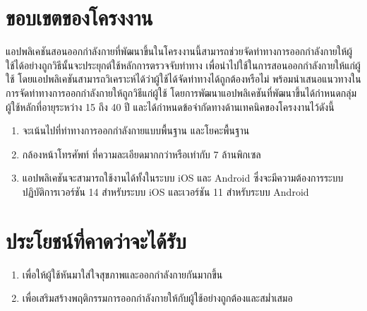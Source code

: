\section{ขอบเขตของโครงงาน}
แอปพลิเคชันสอนออกกำลังกายที่พัฒนาขึ้นในโครงงานนี้สามารถช่วยจัดท่าทางการออกกำลังกายให้ผู้ใช้ได้อย่างถูกวิธีนั้นจะประยุกต์ใช้หลักการตรวจจับท่าทาง 
เพื่อนำไปใช้ในการสอนออกกำลังกายให้แก่ผู้ใช้ โดยแอปพลิเคชันสามารถวิเคราะห์ได้ว่าผู้ใช้ได้จัดท่าทางได้ถูกต้องหรือไม่ พร้อมนำเสนอแนวทางในการจัดท่าทางการออกกำลังกายให้ถูกวิธีแก่ผู้ใช้ 
โดยการพัฒนาแอปพลิเคชันที่พัฒนาขึ้นได้กำหนดกลุ่มผู้ใช้หลักที่อายุระหว่าง 15 ถึง 40 ปี และได้กำหนดข้อจำกัดทางด้านเทคนิคของโครงงานไว้ดังนี้
\begin{enumerate}
    \item จะเน้นไปที่ท่าทางการออกกำลังกายแบบพื้นฐาน และโยคะพื้นฐาน
    \item กล้องหน้าโทรศัพท์ ที่ความละเอียดมากกว่าหรือเท่ากับ 7 ล้านพิกเซล
    \item แอปพลิเคชันจะสามารถใช้งานได้ทั้งในระบบ iOS และ Android ซึ่งจะมีความต้องการระบบปฏิบัติการเวอร์ชัน 14 สำหรับระบบ iOS และเวอร์ชัน 11 สำหรับระบบ Android
\end{enumerate}

\section{ประโยชน์ที่คาดว่าจะได้รับ}
\begin{enumerate}
    \item เพื่อให้ผู้ใช้หันมาใส่ใจสุขภาพและออกกำลังกายกันมากขึ้น
    \item เพื่อเสริมสร้างพฤติกรรมการออกกำลังกายให้กับผู้ใช้อย่างถูกต้องและสม่ำเสมอ
\end{enumerate}

